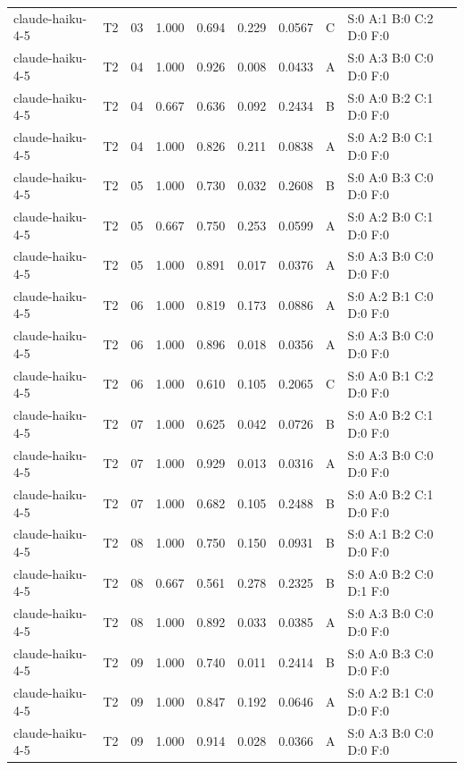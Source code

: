 \begin{longtable}{llrrrrrll}
claude-haiku-4-5 & T2 & 03 & 1.000 & 0.694 & 0.229 & 0.0567 & C & \tiny S:0 A:1 B:0 C:2 D:0 F:0 \\
claude-haiku-4-5 & T2 & 04 & 1.000 & 0.926 & 0.008 & 0.0433 & A & \tiny S:0 A:3 B:0 C:0 D:0 F:0 \\
claude-haiku-4-5 & T2 & 04 & 0.667 & 0.636 & 0.092 & 0.2434 & B & \tiny S:0 A:0 B:2 C:1 D:0 F:0 \\
claude-haiku-4-5 & T2 & 04 & 1.000 & 0.826 & 0.211 & 0.0838 & A & \tiny S:0 A:2 B:0 C:1 D:0 F:0 \\
claude-haiku-4-5 & T2 & 05 & 1.000 & 0.730 & 0.032 & 0.2608 & B & \tiny S:0 A:0 B:3 C:0 D:0 F:0 \\
claude-haiku-4-5 & T2 & 05 & 0.667 & 0.750 & 0.253 & 0.0599 & A & \tiny S:0 A:2 B:0 C:1 D:0 F:0 \\
claude-haiku-4-5 & T2 & 05 & 1.000 & 0.891 & 0.017 & 0.0376 & A & \tiny S:0 A:3 B:0 C:0 D:0 F:0 \\
claude-haiku-4-5 & T2 & 06 & 1.000 & 0.819 & 0.173 & 0.0886 & A & \tiny S:0 A:2 B:1 C:0 D:0 F:0 \\
claude-haiku-4-5 & T2 & 06 & 1.000 & 0.896 & 0.018 & 0.0356 & A & \tiny S:0 A:3 B:0 C:0 D:0 F:0 \\
claude-haiku-4-5 & T2 & 06 & 1.000 & 0.610 & 0.105 & 0.2065 & C & \tiny S:0 A:0 B:1 C:2 D:0 F:0 \\
claude-haiku-4-5 & T2 & 07 & 1.000 & 0.625 & 0.042 & 0.0726 & B & \tiny S:0 A:0 B:2 C:1 D:0 F:0 \\
claude-haiku-4-5 & T2 & 07 & 1.000 & 0.929 & 0.013 & 0.0316 & A & \tiny S:0 A:3 B:0 C:0 D:0 F:0 \\
claude-haiku-4-5 & T2 & 07 & 1.000 & 0.682 & 0.105 & 0.2488 & B & \tiny S:0 A:0 B:2 C:1 D:0 F:0 \\
claude-haiku-4-5 & T2 & 08 & 1.000 & 0.750 & 0.150 & 0.0931 & B & \tiny S:0 A:1 B:2 C:0 D:0 F:0 \\
claude-haiku-4-5 & T2 & 08 & 0.667 & 0.561 & 0.278 & 0.2325 & B & \tiny S:0 A:0 B:2 C:0 D:1 F:0 \\
claude-haiku-4-5 & T2 & 08 & 1.000 & 0.892 & 0.033 & 0.0385 & A & \tiny S:0 A:3 B:0 C:0 D:0 F:0 \\
claude-haiku-4-5 & T2 & 09 & 1.000 & 0.740 & 0.011 & 0.2414 & B & \tiny S:0 A:0 B:3 C:0 D:0 F:0 \\
claude-haiku-4-5 & T2 & 09 & 1.000 & 0.847 & 0.192 & 0.0646 & A & \tiny S:0 A:2 B:1 C:0 D:0 F:0 \\
claude-haiku-4-5 & T2 & 09 & 1.000 & 0.914 & 0.028 & 0.0366 & A & \tiny S:0 A:3 B:0 C:0 D:0 F:0 \\

\end{longtable}
